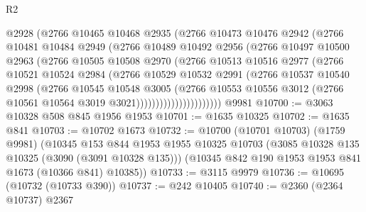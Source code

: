 \begin{lexlean}{R2}
\begin{coremodule}
                      @2928
                      (@2766
                        @10465
                        @10468
                        @2935
                        (@2766
                          @10473
                          @10476
                          @2942
                          (@2766
                            @10481
                            @10484
                            @2949
                            (@2766
                              @10489
                              @10492
                              @2956
                              (@2766
                                @10497
                                @10500
                                @2963
                                (@2766
                                  @10505
                                  @10508
                                  @2970
                                  (@2766
                                    @10513
                                    @10516
                                    @2977
                                    (@2766
                                      @10521
                                      @10524
                                      @2984
                                      (@2766
                                        @10529
                                        @10532
                                        @2991
                                        (@2766
                                          @10537
                                          @10540
                                          @2998
                                          (@2766
                                            @10545
                                            @10548
                                            @3005
                                            (@2766
                                              @10553
                                              @10556
                                              @3012
                                              (@2766 @10561 @10564 @3019 @3021))))))))))))))))))))))
    @9981
@10700 := @3063 @10328 @508 @845 @1956 @1953
@10701 := @1635 @10325
@10702 := @1635 @841
@10703 := @10702 @1673
@10732 := @10700
    (@10701 @10703)
    (@1759 @9981)
    (@10345
      @153
      @844
      @1953
      @1955
      @10325
      @10703
      (@3085 @10328 @135 @10325 (@3090 (@3091 @10328 @135)))
      (@10345 @842 @190 @1953 @1953 @841 @1673 (@10366 @841) @10385))
@10733 := @3115 @9979
@10736 := @10695 (@10732 (@10733 @390))
@10737 := @242 @10405
@10740 := @2360 (@2364 @10737) @2367

\end{coremodule}
\end{lexlean}
